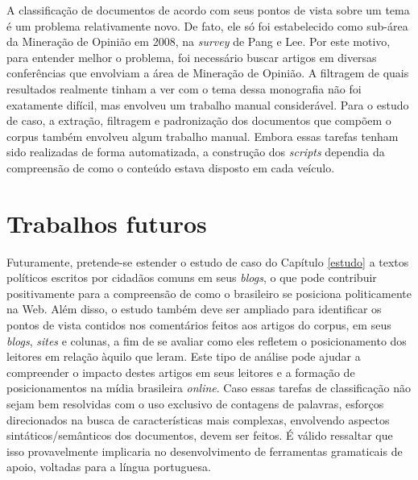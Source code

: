 A classificação de documentos de acordo com seus pontos de vista sobre um tema é um problema relativamente novo. De fato, ele só foi estabelecido como sub-área da Mineração de Opinião em 2008, na \emph{survey} de Pang e Lee. Por este motivo, para entender melhor o problema, foi necessário buscar artigos em diversas conferências que envolviam a área de Mineração de Opinião. A filtragem de quais resultados realmente tinham a ver com o tema dessa monografia não foi exatamente difícil, mas envolveu um trabalho manual considerável. Para o estudo de caso, a extração, filtragem e padronização dos documentos que compõem o corpus também envolveu algum trabalho manual. Embora essas tarefas tenham sido realizadas de forma automatizada, a construção dos \emph{scripts} dependia da compreensão de como o conteúdo estava disposto em cada veículo.  

\section{Trabalhos futuros}

Futuramente, pretende-se estender o estudo de caso do Capítulo \ref{estudo} a textos políticos escritos por cidadãos comuns em seus \emph{blogs}, o que pode contribuir positivamente para a compreensão de como o brasileiro se posiciona politicamente na Web. Além disso, o estudo também deve ser ampliado para identificar os pontos de vista contidos nos comentários feitos aos artigos do corpus, em seus \emph{blogs}, \emph{sites} e colunas, a fim de se avaliar como eles refletem o posicionamento dos leitores em relação àquilo que leram. Este tipo de análise pode ajudar a compreender o impacto destes artigos em seus leitores e a formação de posicionamentos na mídia brasileira \emph{online}. Caso essas tarefas de classificação não sejam bem resolvidas com o uso exclusivo de contagens de palavras, esforços direcionados na busca de características mais complexas, envolvendo aspectos sintáticos/semânticos dos documentos, devem ser feitos. É válido ressaltar que isso provavelmente implicaria no desenvolvimento de ferramentas gramaticais de apoio, voltadas para a língua portuguesa.


